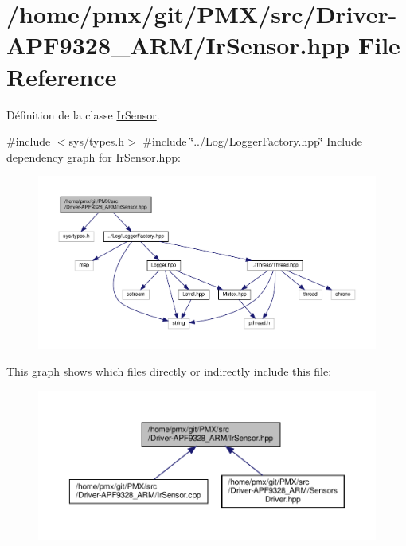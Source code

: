 \hypertarget{Driver-APF9328__ARM_2IrSensor_8hpp}{}\section{/home/pmx/git/\+P\+M\+X/src/\+Driver-\/\+A\+P\+F9328\+\_\+\+A\+R\+M/\+Ir\+Sensor.hpp File Reference}
\label{Driver-APF9328__ARM_2IrSensor_8hpp}


Définition de la classe \hyperlink{classIrSensor}{Ir\+Sensor}.  


{\ttfamily \#include $<$sys/types.\+h$>$}\newline
{\ttfamily \#include \char`\"{}../\+Log/\+Logger\+Factory.\+hpp\char`\"{}}\newline
Include dependency graph for Ir\+Sensor.\+hpp\+:
\nopagebreak
\begin{figure}[H]
\begin{center}
\leavevmode
\includegraphics[width=350pt]{Driver-APF9328__ARM_2IrSensor_8hpp__incl}
\end{center}
\end{figure}
This graph shows which files directly or indirectly include this file\+:
\nopagebreak
\begin{figure}[H]
\begin{center}
\leavevmode
\includegraphics[width=350pt]{Driver-APF9328__ARM_2IrSensor_8hpp__dep__incl}
\end{center}
\end{figure}
